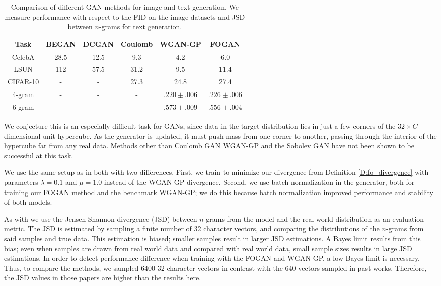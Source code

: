 \documentclass{article}
\begin{document}
  \begin{table}
\caption{Comparison of different GAN methods for image and text generation.
We measure performance with respect to the FID on the image datasets
and JSD between $n$-grams for text generation.}\label{Ta:results}
\centering
\begin{scriptsize}
  \begin{tabular}{cccccc}\toprule
  Task & BEGAN & DCGAN & Coulomb & WGAN-GP & FOGAN \\ \midrule
  CelebA & 28.5 & 12.5 & 9.3 & 4.2 & 6.0 \\
  LSUN & 112 & 57.5 & 31.2 &  9.5 & 11.4 \\
  CIFAR-10 & - & - & 27.3 & 24.8 & 27.4 \\
  4-gram & -    & -    & -   & $.220\pm .006$ & $.226\pm .006$ \\
  6-gram & - & - & -   & $.573\pm .009$ & $.556 \pm .004$ \\ \bottomrule
  \end{tabular}
 \end{scriptsize}
 \end{table}

 We conjecture this is an especially difficult task for GANs, since data in the target distribution lies in just a few corners of
 the $32\times C$ dimensional unit hypercube. As the generator is updated, it must push mass from one corner to another, passing through
 the interior of the hypercube far from any real data. Methods other than Coulomb GAN \cite{unterthiner2017coulomb}
 WGAN-GP \cite{gulrajani2017improved,heusel2017gans} and the Sobolev GAN \cite{mroueh2017sobolev}
 have not been shown to be successful at this task.
 
 We use the same setup as in both \cite{gulrajani2017improved,heusel2017gans}
 with two differences.
 First, we train to minimize our divergence
 from Definition \ref{D:fo_divergence} with parameters $\lambda=0.1$ and $\mu=1.0$ instead of the WGAN-GP divergence.
 Second, we use batch normalization in the generator, both for training our FOGAN method and the benchmark WGAN-GP;
 we do this because batch normalization improved performance and stability of both models.
 
 As with \cite{gulrajani2017improved,heusel2017gans} we use the Jensen-Shannon-divergence (JSD) between $n$-grams from the model and the real world distribution
 as an evaluation metric.
 The JSD is estimated by sampling a finite number of 32 character vectors,
 and comparing the distributions of the $n$-grams from said samples and true data.
 This estimation is biased; smaller samples result in larger JSD estimations.
 A Bayes limit results from this bias;
 even when samples are drawn from real world data and compared with real world data, small sample sizes results in large JSD estimations.
 In order to detect performance difference when training with the FOGAN and WGAN-GP, a low Bayes limit is necessary.
 Thus, to compare the methods, we sampled $6400$ 32 character vectors in contrast with
 the $640$ vectors sampled in past works. Therefore, the JSD values in those papers are higher than the results here.
 
\end{document}
